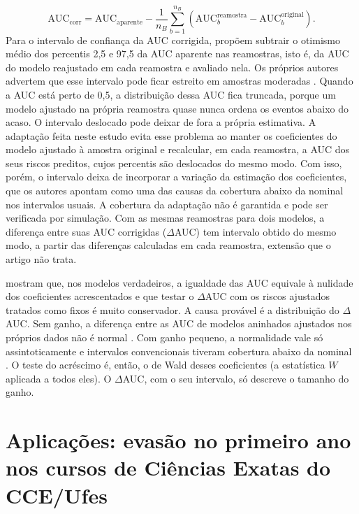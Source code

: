 \documentclass[12pt,a4paper]{article}
\begin{document}
\begin{equation}
  \text{AUC}_{\text{corr}} = \text{AUC}_{\text{aparente}} - \frac{1}{n_B}\sum_{b=1}^{n_B} \left(\text{AUC}_b^{\text{reamostra}} - \text{AUC}_b^{\text{original}}\right).
\end{equation}
Para o intervalo de confiança da AUC corrigida, \citet[pp.~7--8]{noma2021confidence} propõem subtrair o otimismo médio dos percentis 2,5 e 97,5 da AUC aparente nas reamostras, isto é, da AUC do modelo reajustado em cada reamostra e avaliado nela. Os próprios autores advertem que esse intervalo pode ficar estreito em amostras moderadas \citep[p.~8]{noma2021confidence}. Quando a AUC está perto de 0,5, a distribuição dessa AUC fica truncada, porque um modelo ajustado na própria reamostra quase nunca ordena os eventos abaixo do acaso. O intervalo deslocado pode deixar de fora a própria estimativa. A adaptação feita neste estudo evita esse problema ao manter os coeficientes do modelo ajustado à amostra original e recalcular, em cada reamostra, a AUC dos seus riscos preditos, cujos percentis são deslocados do mesmo modo. Com isso, porém, o intervalo deixa de incorporar a variação da estimação dos coeficientes, que os autores apontam como uma das causas da cobertura abaixo da nominal nos intervalos usuais. A cobertura da adaptação não é garantida e pode ser verificada por simulação. Com as mesmas reamostras para dois modelos, a diferença entre suas AUC corrigidas ($\Delta$AUC) tem intervalo obtido do mesmo modo, a partir das diferenças calculadas em cada reamostra, extensão que o artigo não trata.

\citet{pepe2013testing} mostram que, nos modelos verdadeiros, a igualdade das AUC equivale à nulidade dos coeficientes acrescentados e que testar o $\Delta$AUC com os riscos ajustados tratados como fixos é muito conservador. A causa provável é a distribuição do $\Delta$AUC. Sem ganho, a diferença entre as AUC de modelos aninhados ajustados nos próprios dados não é normal \citep{demler2012misuse,heller2017inference}. Com ganho pequeno, a normalidade vale só assintoticamente e intervalos convencionais tiveram cobertura abaixo da nominal \citep{heller2017inference}. O teste do acréscimo é, então, o de Wald desses coeficientes (a estatística $W$ aplicada a todos eles). O $\Delta$AUC, com o seu intervalo, só descreve o tamanho do ganho.

\section{Aplicações: evasão no primeiro ano nos cursos de Ciências Exatas do CCE/Ufes}
\label{sec:aplicacoes}
\end{document}
